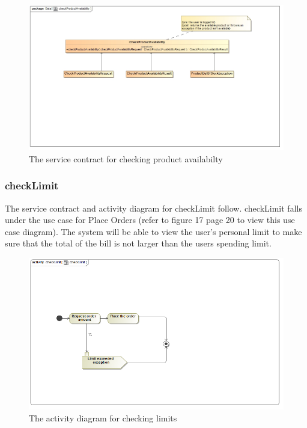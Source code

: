 \documentclass[a4paper,12pt]{article}
\begin{document}
\begin{figure}[H]
	\centering
	\includegraphics[width=1.0\textwidth]{../images/checkProductAvailabilitySC.jpg}
	\caption{The service contract for checking product availabilty}
\end{figure}

\subsubsection{checkLimit}
The service contract and activity diagram for checkLimit follow. checkLimit falls under the use case for Place Orders (refer to figure 17 page 20 to view this use case diagram). The system will be able to view the user's personal limit to make sure that the total of the bill is not larger than the users spending limit. 
\begin{figure}[H]
  \centering
    \includegraphics[width=1.0\textwidth]{../images/checkLimit.png}
    \caption{The activity diagram for checking limits} 
\end{figure}
\end{document}
